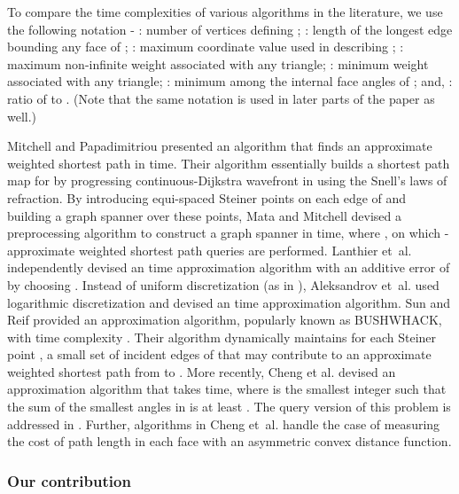 \documentclass[11pt]{article}
\begin{document}
To compare the time complexities of various algorithms in the literature, we use the following notation -
: number of vertices defining ; : length of the longest edge bounding any face of ; : maximum coordinate value used in describing ; : maximum non-infinite weight associated with any triangle; : minimum weight associated with any triangle; : minimum among the internal face angles of ; and, : ratio of  to .
(Note that the same notation is used in later parts of the paper as well.)

Mitchell and Papadimitriou \cite{journals/jacm/MitchellP91} presented an algorithm that finds an approximate weighted shortest path in  time.
Their algorithm essentially builds a shortest path map for  by progressing continuous-Dijkstra wavefront in  using the Snell's laws of refraction.
By introducing  equi-spaced Steiner points on each edge of  and building a graph spanner over these points, Mata and Mitchell \cite{conf/compgeom/MataM97} devised a preprocessing algorithm to construct a graph spanner in  time, where , on which -approximate weighted shortest path queries are performed.
Lanthier et~al. \cite{journals/algorithmica/LanthierMS01} independently devised an  time approximation algorithm with an additive error of  by choosing .
Instead of uniform discretization (as in \cite{conf/compgeom/MataM97}), Aleksandrov et~al. \cite{conf/swat/AleksandrovLMS98,journals/jacm/AleksandrovMS05} used logarithmic discretization and devised an  time approximation algorithm.
Sun and Reif \cite{journals/jal/SunR06} provided an approximation algorithm, popularly known as BUSHWHACK, with time complexity .
Their algorithm dynamically maintains for each Steiner point , a small set of incident edges of  that may contribute to an approximate weighted shortest path from  to .
More recently, Cheng et al. \cite{conf/soda/ChengJV15} devised an approximation algorithm that takes  time, where  is the smallest integer such that the sum of the  smallest angles in  is at least .
The query version of this problem is addressed in \cite{conf/swat/AleksandrovLMS98,journals/jacm/AleksandrovMS05,journals/jal/SunR06,journals/jacm/MitchellP91,journals/siamcomp/ChengNVW10,journals/dcg/AleksandrovDGMNS10}.
Further, algorithms in Cheng et~al. \cite{journals/siamcomp/ChengNVW10} handle the case of measuring the cost of path length in each face with an asymmetric convex distance function. 


\subsubsection*{Our contribution}
\end{document}

